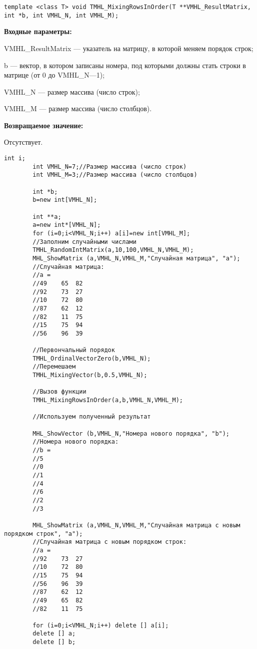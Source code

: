 \documentclass[a4paper,12pt]{article}
\begin{document}
\begin{lstlisting}[label=code_syntax_TMHL_MixingRowsInOrder,caption=Синтаксис]
template <class T> void TMHL_MixingRowsInOrder(T **VMHL_ResultMatrix, int *b, int VMHL_N, int VMHL_M);
\end{lstlisting}

\textbf{Входные параметры:}
 
VMHL\_ResultMatrix --- указатель на матрицу, в которой меняем порядок строк;
 
b --- вектор, в котором записаны номера, под которыми должны стать строки в матрице (от 0 до VMHL\_N---1);
 
VMHL\_N --- размер массива (число строк);
 
VMHL\_M --- размер массива (число столбцов).

\textbf{Возвращаемое значение:}

Отсутствует.


\begin{lstlisting}[label=code_use_TMHL_MixingRowsInOrder,caption=Пример использования]
        int i;
        int VMHL_N=7;//Размер массива (число строк)
        int VMHL_M=3;//Размер массива (число столбцов)

        int *b;
        b=new int[VMHL_N];

        int **a;
        a=new int*[VMHL_N];
        for (i=0;i<VMHL_N;i++) a[i]=new int[VMHL_M];
        //Заполним случайными числами
        TMHL_RandomIntMatrix(a,10,100,VMHL_N,VMHL_M);
        MHL_ShowMatrix (a,VMHL_N,VMHL_M,"Случайная матрица", "a");
        //Случайная матрица:
        //a =
        //49	65	82
        //92	73	27
        //10	72	80
        //87	62	12
        //82	11	75
        //15	75	94
        //56	96	39

        //Первончальный порядок
        TMHL_OrdinalVectorZero(b,VMHL_N);
        //Перемешаем
        TMHL_MixingVector(b,0.5,VMHL_N);

        //Вызов функции
        TMHL_MixingRowsInOrder(a,b,VMHL_N,VMHL_M);

        //Используем полученный результат

        MHL_ShowVector (b,VMHL_N,"Номера нового порядка", "b");
        //Номера нового порядка:
        //b =
        //5
        //0
        //1
        //4
        //6
        //2
        //3

        MHL_ShowMatrix (a,VMHL_N,VMHL_M,"Случайная матрица с новым порядком строк", "a");
        //Случайная матрица с новым порядком строк:
        //a =
        //92	73	27
        //10	72	80
        //15	75	94
        //56	96	39
        //87	62	12
        //49	65	82
        //82	11	75

        for (i=0;i<VMHL_N;i++) delete [] a[i];
        delete [] a;
        delete [] b;
\end{lstlisting}
\end{document}
